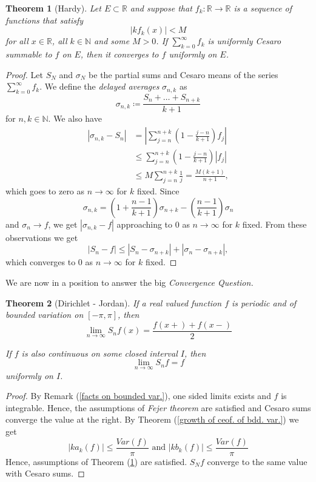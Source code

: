 \documentclass[12pt]{amsart}
\newtheorem{theorem}{Theorem}[section]
\theoremstyle{definition}
\newcommand{\NN}{{\mathbb N}} %
\newcommand{\RR}{{\mathbb R}} %
\begin{document}
\begin{theorem}[Hardy]\label{Hardy}
    Let $E \subset \RR$ and suppose that $f_k: \RR \to \RR$ is a sequence of functions that satisfy
    \[
    |kf_k(x)| < M
    \]
    for all $x \in \RR$, all $k \in \NN$ and some $M > 0$. If $\sum_{k=0}^{\infty}f_k$ is uniformly Cesaro summable to $f$ on $E$,
    then it converges to $f$ uniformly on $E$.
\end{theorem}


\begin{proof}

Let $S_N$ and $\sigma_N$ be the partial sums and Cesaro means of the series $\sum_{k=0}^{\infty}f_k$. We define the \emph{delayed averages} $\sigma_{n,k}$ as 
\[
\sigma_{n,k} \coloneqq \frac{S_{n} + \dots + S_{n+k}}{k+1}
\]
for $n,k \in \NN$. We also have
\[
\begin{aligned}
    |\sigma_{n,k} - S_n| 
    &= \left| \sum_{j=n}^{n+k}\left( 1 - \frac{j-n}{k+1}\right)f_j\right| \\
    &\leq \sum_{j=n}^{n+k}\left( 1 - \frac{j-n}{k+1}\right)|f_j| \\
    &\leq M \sum_{j=n}^{n+k}\frac{1}{j} = \frac{M(k+1)}{n+1},           
\end{aligned}
\]
which goes to zero as $n \to \infty$ for $k$ fixed. Since 
\[
\sigma_{n,k} = \left(1 + \frac{n-1}{k+1}\right)\sigma_{n+k} - \left(\frac{n-1}{k+1}\right)\sigma_{n}
\]
and $\sigma_n \to f$, we get $|\sigma_{n,k} - f|$ approaching to 0 as $n \to \infty$ for $k$ fixed. From these observations we get
\[
|S_n - f| \leq |S_n - \sigma_{n+k}| + |\sigma_n - \sigma_{n+k}|,
\]
which converges to 0 as $n \to \infty$ for $k$ fixed. \qedhere
\end{proof}


We are now in a position to answer the big \emph{Convergence Question.}

\begin{theorem}[Dirichlet - Jordan]\label{Dirichlet - Jordan}
    If a real valued function $f$ is periodic and of bounded variation on $[-\pi,\pi]$, then
    \[
    \lim_{n \to \infty}S_nf(x) = \frac{f(x+) + f(x-)}{2}
    \]

    If $f$ is also continuous on some closed interval $I$, then
    \[
    \lim_{n \to \infty}S_nf = f
    \]
    uniformly on $I$.
\end{theorem}


\begin{proof}
    By Remark (\ref{facts on bounded var.}), one sided limits exists and $f$ is integrable. Hence, the assumptions of \emph{Fejer theorem} are satisfied and Cesaro sums converge the value at the right. By Theorem (\ref{growth of ceof. of bdd. var.}) we get
    \[
    |ka_k(f)|\leq \frac{Var(f)}{\pi}  \text{ and }  |kb_k(f)| \leq \frac{Var(f)}{\pi}
    \]
    Hence, assumptions of Theorem (\ref{Hardy}) are satisfied. $S_Nf$ converge to the same value with Cesaro sums.
\end{proof}
\end{document}
